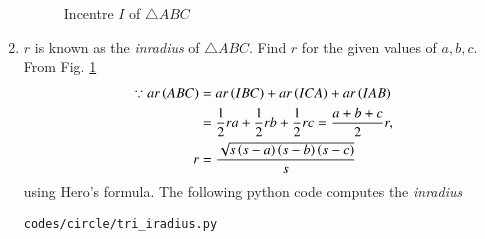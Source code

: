 \begin{enumerate}[label=\arabic*.,ref=\thesubsection.\theenumi]
\begin{figure}[!ht]
\begin{center}
		\resizebox{\columnwidth}{!}{}
	\end{center}
	\caption{Incentre $I$ of $\triangle ABC$}
	\label{fig:tri_icentre}	
\end{figure}
%
\item $r$ is known as the {\em inradius} of $\triangle ABC$.  Find $r$ for  the given values of $a,b,c$.
\\
\solution From Fig. \ref{fig:tri_icentre}
%
\begin{align}
\because ar\left(ABC\right) &= ar\left(IBC\right)+ar\left(ICA\right)+ar\left(IAB\right)
\\
&=\frac{1}{2}ra+\frac{1}{2}rb+\frac{1}{2}rc = \frac{a+b+c}{2}r,
\\
r &= \frac{\sqrt{s\left(s-a\right)\left(s-b\right)\left(s-c\right)}}{s}
\end{align}
%
using Hero's formula.
%
The following python code computes the {\em inradius}
%
\begin{lstlisting}
codes/circle/tri_iradius.py
\end{lstlisting}

\end{enumerate}

